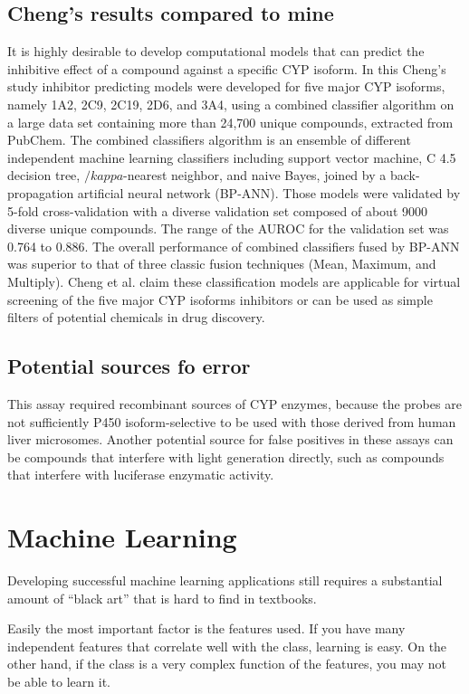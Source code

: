 \subsection{Cheng's results compared to mine}
It is highly desirable to develop computational models that can predict the inhibitive effect of a compound against a specific CYP isoform. In this Cheng's study inhibitor predicting models were developed for five major CYP isoforms, namely 1A2, 2C9, 2C19, 2D6, and 3A4, using a combined classifier algorithm on a large data set containing more than 24,700 unique compounds, extracted from PubChem. The combined classifiers algorithm is an ensemble of different independent machine learning classifiers including support vector machine, C 4.5 decision tree, $/kappa$-nearest neighbor, and naive Bayes, joined by a back-propagation artificial neural network (BP-ANN). Those models were validated by 5-fold cross-validation with a diverse validation set composed of about 9000 diverse unique compounds. The range of the AUROC for the validation set was 0.764 to 0.886. The overall performance of combined classifiers fused by BP-ANN was superior to that of three classic fusion techniques (Mean, Maximum, and Multiply). Cheng et al. claim these classification models are applicable for virtual screening of the five major CYP isoforms inhibitors or can be used as simple filters of potential chemicals in drug discovery.\cite{Cheng2011}

\subsection{Potential sources fo error}
This assay required recombinant sources of CYP enzymes, because the probes are not sufficiently P450 isoform-selective to be used with those derived from human liver microsomes. Another potential source for false positives in these assays can be compounds that interfere with light generation directly, such as compounds that interfere with luciferase enzymatic activity. \cite{Zlokarnik2005}


\section{Machine Learning}
Developing successful machine learning applications still requires a substantial amount of “black art” that is hard to find in textbooks.\cite{Domingos2012}

Easily the most important factor is the features used. If you have many independent features that correlate well with the class, learning is easy. On the other hand, if the class is a very complex function of the features, you may not be able to learn it.\cite{Domingos2012}

